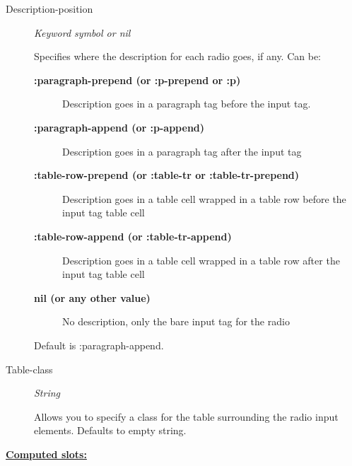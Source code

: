 \documentclass [11pt]{book}
\begin{document}
\begin{itemize}
\begin{description}

\item [Description-position]
\emph{Keyword symbol or nil}

 Specifies where the description for each radio goes, if any.
Can be:


\begin{description}


\item[
\textbf{:paragraph-prepend (or :p-prepend or :p)}]

Description goes in a paragraph tag before the input tag.


\item[
\textbf{:paragraph-append (or :p-append)}]

Description goes in a paragraph tag after the input tag


\item[
\textbf{:table-row-prepend (or :table-tr or :table-tr-prepend)}]

Description goes in a table cell wrapped in a table row before the input tag table cell


\item[
\textbf{:table-row-append (or :table-tr-append)}]

Description goes in a table cell wrapped in a table row after the input tag table cell


\item[
\textbf{nil (or any other value)}]

No description, only the bare input tag for the radio

\end{description}


Default is :paragraph-append.




\item [Table-class]
\emph{String}

 Allows you to specify a class for the table surrounding the radio input elements. Defaults to empty string.




\end{description}






\textbf{
\underline{Computed slots:}}

\begin{description}


\end{description}
\end{itemize}
\end{document}
